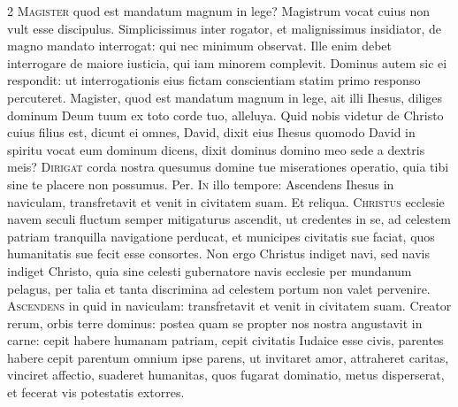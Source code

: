 \begin{multicols*}{2}
\lettrine[lines=2]{\zallmancaps \color{Blue} M}{agister} quod est mandatum magnum in lege? Magistrum vocat cuius non vult esse discipulus. Simplicissimus inter rogator, et malignissimus insidiator, de magno mandato interrogat: qui nec minimum observat. Ille enim debet interrogare de maiore iusticia, qui iam minorem complevit. Dominus autem sic ei respondit: ut interrogationis eius fictam conscientiam statim primo responso percuteret.
 Magister, quod est mandatum magnum in lege, ait illi Ihesus, diliges dominum Deum tuum ex toto corde tuo, alleluya.
 Quid nobis videtur de Christo cuius filius est, dicunt ei omnes, David, dixit eius Ihesus quomodo David in spiritu vocat eum dominum dicens, dixit dominus domino meo sede a dextris meis?
\lettrine[lines=2]{\zallmancaps \color{Red} D}{irigat} corda nostra quesumus domine tue miserationes operatio, quia tibi sine te placere non possumus. Per.
\lettrine[lines=2]{\zallmancaps \color{Blue} I}{n} illo tempore: Ascendens Ihesus in naviculam, transfretavit et venit in civitatem suam. Et reliqua.
 \grecross
\lettrine[lines=2]{\zallmancaps \color{Red} C}{hristus} ecclesie navem seculi fluctum semper mitigaturus ascendit, ut credentes in se, ad celestem patriam tranquilla navigatione perducat, et municipes civitatis sue faciat, quos humanitatis sue fecit esse consortes. Non ergo Christus indiget navi, sed navis indiget Christo, quia sine celesti gubernatore navis ecclesie per mundanum pelagus, per talia et tanta discrimina ad celestem portum non valet pervenire.
\lettrine[lines=2]{\zallmancaps \color{Blue} A}{scendens} in quid in naviculam: transfretavit et venit in civitatem suam. Creator rerum, orbis terre dominus: postea quam se propter nos nostra angustavit in carne: cepit habere humanam patriam, cepit civitatis Iudaice esse civis, parentes habere cepit parentum omnium ipse parens, ut invitaret amor, attraheret caritas, vinciret affectio, suaderet humanitas, quos fugarat dominatio, metus disperserat, et fecerat vis potestatis extorres.

\end{multicols*}
